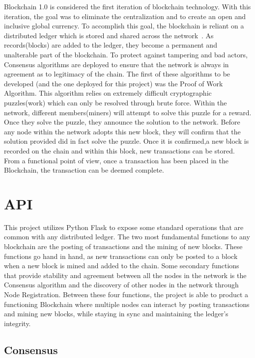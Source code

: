 Blockchain 1.0 is considered the first iteration of blockchain technology. 
With this iteration, the goal was to eliminate the centralization and to 
create an open and inclusive global currency. To accomplish this goal, the 
blockchain is reliant on a distributed ledger which is stored and shared across 
the network~\cite{hid-sp18-414-www-promise-bitcoin-blockchain}. 
As records(blocks) are added to the ledger, they become a permanent and unalterable part of the blockchain. To protect against tampering and bad actors, Consensus algorithms are deployed to ensure that the network is always in agreement as to legitimacy of the chain. The first of these algorithms to be developed (and the one deployed for this project) was the Proof of Work Algorithm. This algorithm relies on extremely difficult cryptographic puzzles(work) which can 
only be resolved through brute force. Within the network, different members(miners) will attempt to solve this puzzle for a reward. Once they solve the puzzle, they announce the solution to the network. Before any node within the network adopts this new block, they will confirm that the solution provided did in fact solve the puzzle. Once it is confirmed,a new block is recorded on the chain and within this block, new transactions can be stored. From a functional point of view, once a transaction has been placed in the Blockchain, the transaction can be deemed complete.~\cite{hid-sp18-414-financialinnovation-zhao}

\section{API}

This project utilizes Python Flask to expose some standard operations that 
are common with any distributed ledger. The two most fundamental functions to any blockchain 
are the posting of transactions and the mining of new blocks. These functions go hand in hand, 
as new transactions can only be posted to a block when a new block is mined and added to the chain. Some secondary functions that provide stability and agreement between all the nodes 
in the network is the Consensus algorithm and the discovery of other nodes in the network 
through Node Registration. Between these four functions, the project is able to product a 
functioning Blockchain where multiple nodes can interact by posting transactions and mining 
new blocks, while staying in sync and maintaining the ledger's integrity.

\subsection{Consensus}

